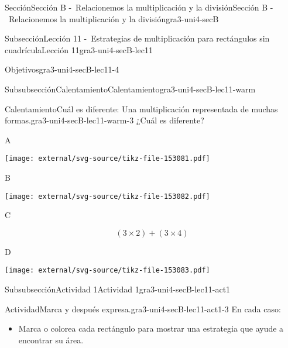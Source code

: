 \documentclass[twoside,10pt,]{article}
\begin{document}
\begin{sectionptx}{Sección}{Sección B -~Relacionemos la multiplicación y la división}{}{Sección B -~Relacionemos la multiplicación y la división}{}{}{gra3-uni4-secB}
\begin{subsectionptx}{Subsección}{Lección 11 -~Estrategias de multiplicación para rectángulos sin cuadrícula}{}{Lección 11}{}{}{gra3-uni4-secB-lec11}
\begin{objectives}{Objetivos}{gra3-uni4-secB-lec11-4}
\begin{itemize}[label=\textbullet]
\end{itemize}
\end{objectives}
%
%
\typeout{************************************************}
\typeout{************************************************}
%
\begin{subsubsectionptx}{Subsubsección}{Calentamiento}{}{Calentamiento}{}{}{gra3-uni4-secB-lec11-warm}
\begin{exploration}{Calentamiento}{Cuál es diferente: Una multiplicación representada de muchas formas.}{gra3-uni4-secB-lec11-warm-3}%
¿Cuál es diferente?%
\begin{sidebyside}{2}{0.05}{0.05}{0.1}%
\begin{sbspanel}{0.4}%
A%
\par
\texttt{[image: external/svg-source/tikz-file-153081.pdf]}
\end{sbspanel}%
\begin{sbspanel}{0.4}%
B%
\par
\texttt{[image: external/svg-source/tikz-file-153082.pdf]}
\end{sbspanel}%
\end{sidebyside}%
\begin{sidebyside}{2}{0.05}{0.05}{0.1}%
\begin{sbspanel}{0.4}%
C%
\par
%
\begin{equation*}
(3\times 2) + (3\times 4)
\end{equation*}
%
\end{sbspanel}%
\begin{sbspanel}{0.4}%
D%
\par
\texttt{[image: external/svg-source/tikz-file-153083.pdf]}
\end{sbspanel}%
\end{sidebyside}%
\end{exploration}%
\end{subsubsectionptx}
%
%
\typeout{************************************************}
\typeout{************************************************}
%
\begin{subsubsectionptx}{Subsubsección}{Actividad 1}{}{Actividad 1}{}{}{gra3-uni4-secB-lec11-act1}
\begin{activity}{Actividad}{Marca y después expresa.}{gra3-uni4-secB-lec11-act1-3}%
En cada caso:%
%
\begin{itemize}[label=\textbullet]
\item{}Marca o colorea cada rectángulo para mostrar una estrategia que ayude a encontrar su área.%

\end{itemize}
\end{activity}
\end{subsubsectionptx}
\end{subsectionptx}
\end{sectionptx}
\end{document}
